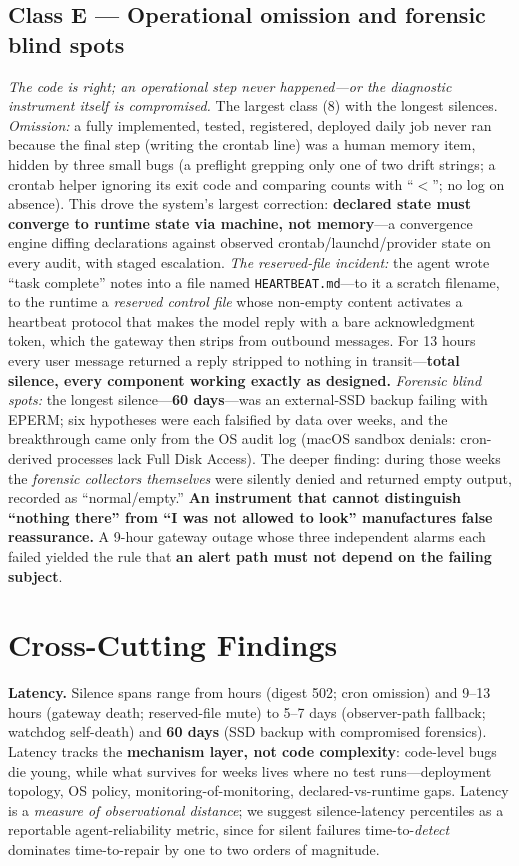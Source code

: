 \documentclass[conference]{IEEEtran}
\begin{document}
\subsection{Class E --- Operational omission and forensic blind spots}
\emph{The code is right; an operational step never happened---or the
diagnostic instrument itself is compromised.} The largest class (8) with
the longest silences. \emph{Omission:} a fully implemented, tested,
registered, deployed daily job never ran because the final step (writing
the crontab line) was a human memory item, hidden by three small bugs (a
preflight grepping only one of two drift strings; a crontab helper
ignoring its exit code and comparing counts with ``$<$''; no log on
absence). This drove the system's largest correction: \textbf{declared
state must converge to runtime state via machine, not memory}---a
convergence engine diffing declarations against observed
crontab/launchd/provider state on every audit, with staged escalation.
\emph{The reserved-file incident:} the agent wrote ``task complete'' notes
into a file named \texttt{HEARTBEAT.md}---to it a scratch filename, to the
runtime a \emph{reserved control file} whose non-empty content activates a
heartbeat protocol that makes the model reply with a bare acknowledgment
token, which the gateway then strips from outbound messages. For 13 hours
every user message returned a reply stripped to nothing in
transit---\textbf{total silence, every component working exactly as
designed.} \emph{Forensic blind spots:} the longest silence---\textbf{60
days}---was an external-SSD backup failing with EPERM; six hypotheses were
each falsified by data over weeks, and the breakthrough came only from the
OS audit log (macOS sandbox denials: cron-derived processes lack Full Disk
Access). The deeper finding: during those weeks the \emph{forensic
collectors themselves} were silently denied and returned empty output,
recorded as ``normal/empty.'' \textbf{An instrument that cannot
distinguish ``nothing there'' from ``I was not allowed to look''
manufactures false reassurance.} A 9-hour gateway outage whose three
independent alarms each failed yielded the rule that \textbf{an alert path
must not depend on the failing subject}.

\section{Cross-Cutting Findings}\label{sec:findings}
\textbf{Latency.} Silence spans range from hours (digest 502; cron
omission) and 9--13 hours (gateway death; reserved-file mute) to 5--7 days
(observer-path fallback; watchdog self-death) and \textbf{60 days} (SSD
backup with compromised forensics). Latency tracks the \textbf{mechanism
layer, not code complexity}: code-level bugs die young, while what survives
for weeks lives where no test runs---deployment topology, OS policy,
monitoring-of-monitoring, declared-vs-runtime gaps. Latency is a
\emph{measure of observational distance}; we suggest silence-latency
percentiles as a reportable agent-reliability metric, since for silent
failures time-to-\emph{detect} dominates time-to-repair by one to two
orders of magnitude.
\end{document}

